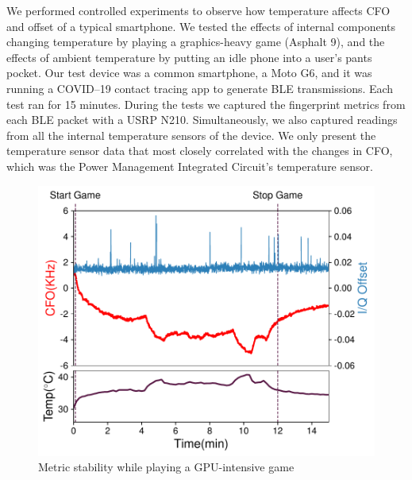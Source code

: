 We performed controlled experiments to observe how temperature affects CFO and \iq offset of a typical smartphone. We tested the effects of internal components changing temperature by playing a
graphics-heavy game (Asphalt 9), and the effects of ambient temperature by putting an idle phone into a user's pants
pocket.
%
Our test device was a common smartphone, a Moto G6, and it was running a COVID--19 contact tracing app to generate BLE transmissions.
%
Each test ran for 15 minutes. During the tests we captured the fingerprint metrics from each BLE packet with a USRP N210.
%
Simultaneously, we also captured readings from all the internal temperature sensors of the device.
We only present the temperature sensor data that most closely correlated with the changes in
CFO, which was the Power Management Integrated Circuit's temperature sensor.

\begin{figure}
    \centering
    \includegraphics[width = \linewidth]{bletracking/plots/gameplay_temp_cfoiq.pdf} 
    \caption{Metric stability while playing a GPU-intensive game}
    \label{fig:exert_cfo}
\end{figure}



